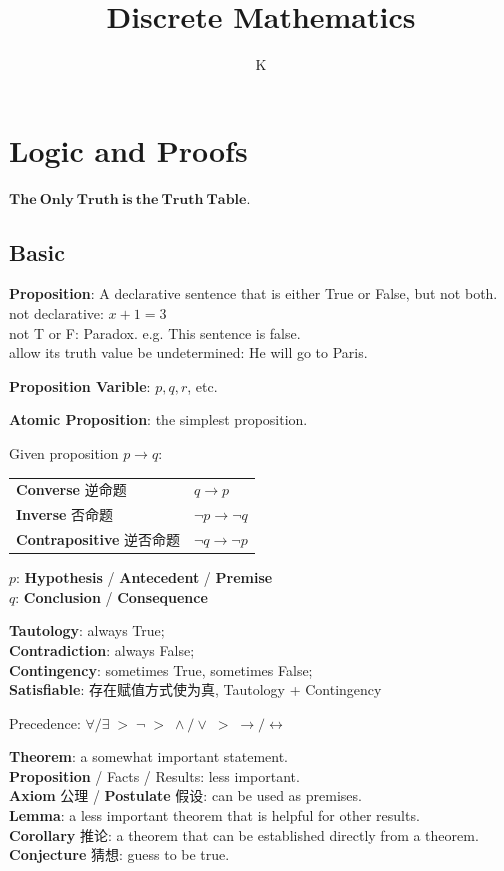\documentclass[12pt, a4paper, UTF8, openany]{ctexbook}
\title{Discrete Mathematics}
\author{K}
\newcommand{\bi}{\leftrightarrow} %
\begin{document}
    \maketitle

    \tableofcontents %
    \cleardoublepage

    \chapter{Logic and Proofs}
    {\large $\mathbf{The\ Only\ Truth\ is\ the\ Truth\ Table.}$}
    
    \section{Basic}
    \textbf{Proposition}: A declarative sentence that is either True or False, but not both. \\
    not declarative: $x + 1 = 3$ \\
    not T or F: Paradox. e.g. This sentence is false. \\
    allow its truth value be undetermined: He will go to Paris.

    \textbf{Proposition Varible}: $p, q, r$, etc.

    \textbf{Atomic Proposition}: the simplest proposition.

    Given proposition $p \to q$:
    \begin{longtable}[h]{*{2}{l}}
        \textbf{Converse} 逆命题 & $q \to p$ \\
        \textbf{Inverse} 否命题 & $\lnot p \to \lnot q$ \\
        \textbf{Contrapositive} 逆否命题 & $\lnot q \to \lnot p$
    \end{longtable}

    $p$: \textbf{Hypothesis} / \textbf{Antecedent} / \textbf{Premise} \\
    $q$: \textbf{Conclusion} / \textbf{Consequence}

    \textbf{Tautology}: always True; \\
    \textbf{Contradiction}: always False; \\
    \textbf{Contingency}: sometimes True, sometimes False; \\
    \textbf{Satisfiable}: 存在赋值方式使为真, Tautology + Contingency

    Precedence: $\forall/\exists \;>\; \lnot \;>\; \land/\lor \;>\; \to/\bi$

    \textbf{Theorem}: a somewhat important statement. \\
    \textbf{Proposition} / Facts / Results: less important. \\
    \textbf{Axiom} 公理 / \textbf{Postulate} 假设: can be used as premises. \\
    \textbf{Lemma}: a less important theorem that is helpful for other results. \\
    \textbf{Corollary} 推论: a theorem that can be established directly from a theorem. \\
    \textbf{Conjecture} 猜想: guess to be true.
\end{document}

